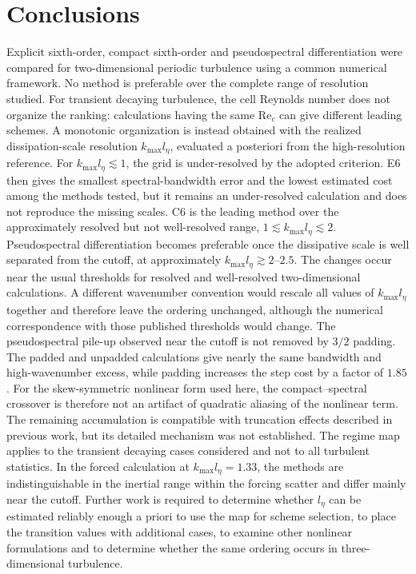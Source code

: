 \documentclass[11pt,a4paper]{article}
\newcommand{\Rey}{\mathrm{Re}}
\begin{document}
\section{Conclusions}
Explicit sixth-order, compact sixth-order and pseudospectral differentiation were compared for two-dimensional periodic turbulence using a common numerical framework. No method is preferable over the complete range of resolution studied. For transient decaying turbulence, the cell Reynolds number does not organize the ranking: calculations having the same $\Rey_c$ can give different leading schemes. A monotonic organization is instead obtained with the realized dissipation-scale resolution $k_{\max}l_\eta$, evaluated a posteriori from the high-resolution reference.
For $k_{\max}l_\eta\lesssim1$, the grid is under-resolved by the adopted criterion. E6 then gives the smallest spectral-bandwidth error and the lowest estimated cost among the methods tested, but it remains an under-resolved calculation and does not reproduce the missing scales. C6 is the leading method over the approximately resolved but not well-resolved range, $1\lesssim k_{\max}l_\eta\lesssim2$. Pseudospectral differentiation becomes preferable once the dissipative scale is well separated from the cutoff, at approximately $k_{\max}l_\eta\gtrsim2$--$2.5$. The changes occur near the usual thresholds for resolved and well-resolved two-dimensional calculations. A different wavenumber convention would rescale all values of $k_{\max}l_\eta$ together and therefore leave the ordering unchanged, although the numerical correspondence with those published thresholds would change.
The pseudospectral pile-up observed near the cutoff is not removed by $3/2$ padding. The padded and unpadded calculations give nearly the same bandwidth and high-wavenumber excess, while padding increases the step cost by a factor of $1.85$. For the skew-symmetric nonlinear form used here, the compact--spectral crossover is therefore not an artifact of quadratic aliasing of the nonlinear term. The remaining accumulation is compatible with truncation effects described in previous work, but its detailed mechanism was not established.
The regime map applies to the transient decaying cases considered and not to all turbulent statistics. In the forced calculation at $k_{\max}l_\eta=1.33$, the methods are indistinguishable in the inertial range within the forcing scatter and differ mainly near the cutoff. Further work is required to determine whether $l_\eta$ can be estimated reliably enough a priori to use the map for scheme selection, to place the transition values with additional cases, to examine other nonlinear formulations and to determine whether the same ordering occurs in three-dimensional turbulence.
\end{document}
